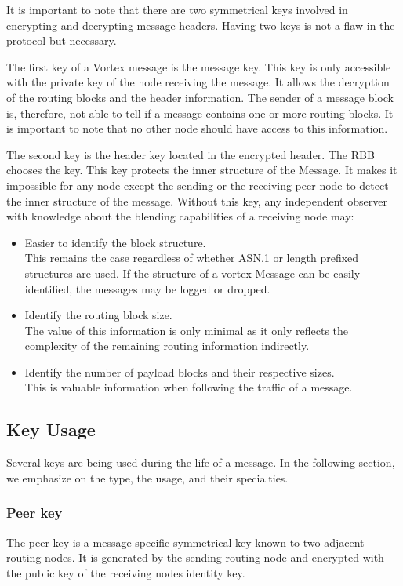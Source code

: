 It is important to note that there are two symmetrical keys involved in encrypting and decrypting message headers. Having two keys is not a flaw in the protocol but necessary. 

The first key of a Vortex message is the message key. This key is only accessible with the private key of the node receiving the message. It allows the decryption of the routing blocks and the header information. The sender of a message block is, therefore, not able to tell if a message contains one or more routing blocks. It is important to note that no other node should have access to this information. 

The second key is the header key located in the encrypted header. The RBB chooses the key. This key protects the inner structure of the Message. It makes it impossible for any node except the sending or the receiving peer node to detect the inner structure of the message. Without this key, any independent observer with knowledge about the blending capabilities of a receiving node may:
\begin{itemize}
	\item Easier to identify the block structure.\\ 
	This remains the case regardless of whether ASN.1 or length prefixed structures are used. If the structure of a vortex Message can be easily identified, the messages may be logged or dropped.
	\item Identify the routing block size.\\
	The value of this information is only minimal as it only reflects the complexity of the remaining routing information indirectly.
	\item Identify the number of payload blocks and their respective sizes. \\
	This is valuable information when following the traffic of a message.
\end{itemize}

\subsection{Key Usage}
Several keys are being used during the life of a message. In the following section, we emphasize on the type, the usage, and their specialties.

\subsubsection{Peer key}
The peer key is a message specific symmetrical key known to two adjacent routing nodes. It is generated by the sending routing node and encrypted with the public key of the receiving nodes identity key.

